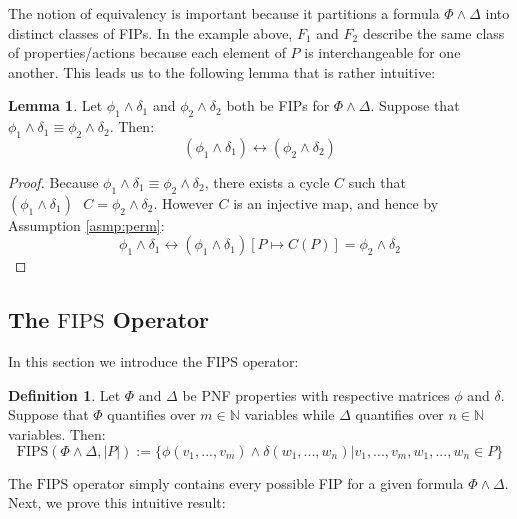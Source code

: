 \documentclass[12pt]{article}
\theoremstyle{definition}
\newtheorem{lemma}{Lemma}
\newtheorem{definition}{Definition}
\theoremstyle{remark}
\newcommand{\msp}{\text{ }}
\newcommand{\fips}{\text{FIPS}}
\begin{document}
The notion of equivalency is important because it partitions a formula $\Phi \land \Delta$ into distinct classes of FIPs.  In the example above, $F_1$ and $F_2$ describe the same class of properties/actions because each element of $P$ is interchangeable for one another.  This leads us to the following lemma that is rather intuitive:

\begin{lemma}
  \label{lem:eqiv-bijec}
  Let $\phi_1\land\delta_1$ and $\phi_2\land\delta_2$ both be FIPs for $\Phi\land\Delta$.  Suppose that $\phi_1\land\delta_1 \equiv \phi_2\land\delta_2$.  Then:
  $$(\phi_1 \land \delta_1) \leftrightarrow (\phi_2 \land \delta_2)$$
\end{lemma}
\begin{proof}
  Because $\phi_1\land\delta_1 \equiv \phi_2\land\delta_2$, there exists a cycle $C$ such that $(\phi_1\land\delta_1) \msp C = \phi_2\land\delta_2$.  However $C$ is an injective map, and hence by Assumption \ref{asmp:perm}:
  $$\phi_1\land\delta_1 \leftrightarrow (\phi_1\land\delta_1)[P \mapsto C(P)] = \phi_2\land\delta_2$$
\end{proof}

\subsection{The $\fips$ Operator}

In this section we introduce the $\fips$ operator:
\begin{definition}
  Let $\Phi$ and $\Delta$ be PNF properties with respective matrices $\phi$ and $\delta$.  Suppose that $\Phi$ quantifies over $m \in \mathbb{N}$ variables while $\Delta$ quantifies over $n \in \mathbb{N}$ variables.  Then:
  $$\fips(\Phi \land \Delta, |P|) := \{\phi(v_1,...,v_m) \land \delta(w_1,...,w_n) | v_1,...,v_m,w_1,...,w_n \in P\}$$
\end{definition}

The $\fips$ operator simply contains every possible FIP for a given formula $\Phi \land \Delta$.  Next, we prove this intuitive result:
\end{document}
